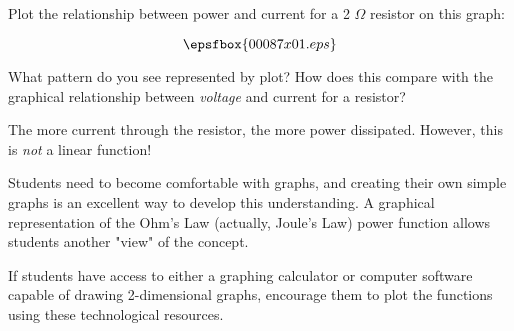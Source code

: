 

Plot the relationship between power and current for a 2 $\Omega$ resistor on this graph:

$$\epsfbox{00087x01.eps}$$

What pattern do you see represented by plot?  How does this compare with the graphical relationship between {\it voltage} and current for a resistor?







The more current through the resistor, the more power dissipated.  However, this is {\it not} a linear function!







Students need to become comfortable with graphs, and creating their own simple graphs is an excellent way to develop this understanding.  A graphical representation of the Ohm's Law (actually, Joule's Law) power function allows students another "view" of the concept.

If students have access to either a graphing calculator or computer software capable of drawing 2-dimensional graphs, encourage them to plot the functions using these technological resources.




